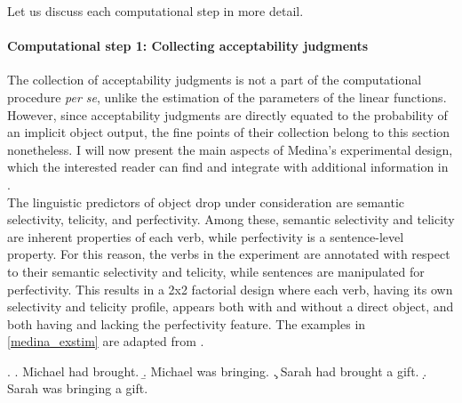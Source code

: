 Let us discuss each computational step in more detail.

\paragraph{Computational step 1: Collecting acceptability judgments} The collection of acceptability judgments is not a part of the computational procedure \textit{per se}, unlike the estimation of the parameters of the linear functions. However, since acceptability judgments are directly equated to the probability of an implicit object output, the fine points of their collection belong to this section nonetheless. I will now present the main aspects of Medina's experimental design, which the interested reader can find and integrate with additional information in \textcite[110-134]{Medina2007}.\\
The linguistic predictors of object drop under consideration are semantic selectivity, telicity, and perfectivity. Among these, semantic selectivity and telicity are inherent properties of each verb, while perfectivity is a sentence-level property. For this reason, the verbs in the experiment are annotated with respect to their semantic selectivity and telicity, while sentences are manipulated for perfectivity. This results in a 2x2 factorial design where each verb, having its own selectivity and telicity profile, appears both with and without a direct object, and both having and lacking the perfectivity feature. The examples in \ref{medina_exstim} are adapted from \textcite[113]{Medina2007}.

\ex. \label{medina_exstim} \a. \label{medina_exstim1} Michael had brought.
\b. \label{medina_exstim2}  Michael was bringing.
\c. \label{medina_exstim3}  Sarah had brought a gift.
\d. \label{medina_exstim4}  Sarah was bringing a gift.

